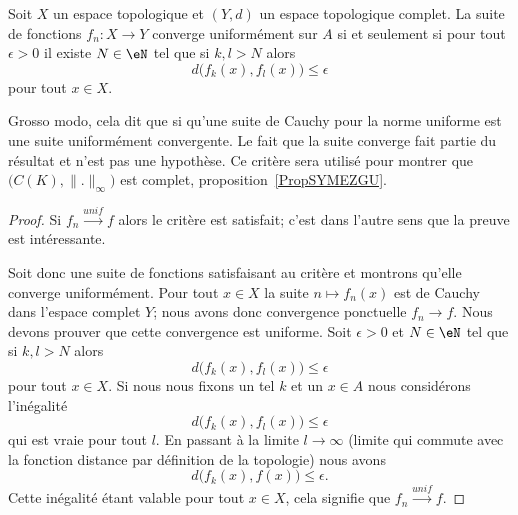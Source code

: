\begin{proposition}   \label{PropNTEynwq}
    Soit \( X\) un espace topologique et \( (Y,d)\) un espace topologique complet. La suite de fonctions \( f_n\colon X\to Y\) converge uniformément sur \( A\) si et seulement si pour tout \( \epsilon>0\) il existe \( N\in \eN\) tel que si \( k,l>N\) alors
    \begin{equation}
        d\big( f_k(x),f_l(x) \big)\leq \epsilon
    \end{equation}
    pour tout \( x\in X\).
\end{proposition}
Grosso modo, cela dit que si qu'une suite de Cauchy pour la norme uniforme est une suite uniformément convergente. Le fait que la suite converge fait partie du résultat et n'est pas une hypothèse. Ce critère sera utilisé pour montrer que \( \big( C(K),\| . \|_{\infty} \big)\) est complet, proposition~\ref{PropSYMEZGU}.

\begin{proof}
    Si \( f_n\stackrel{unif}{\longrightarrow}f\) alors le critère est satisfait; c'est dans l'autre sens que la preuve est intéressante.

    Soit donc une suite de fonctions satisfaisant au critère et montrons qu'elle converge uniformément. Pour tout \( x\in X\) la suite \( n\mapsto f_n(x)\) est de Cauchy dans l'espace complet \( Y\); nous avons donc convergence ponctuelle \( f_n\to f\). Nous devons prouver que cette convergence est uniforme. Soit \( \epsilon>0\) et \( N\in \eN\) tel que si \( k,l>N\) alors
    \begin{equation}
        d\big( f_k(x),f_l(x) \big)\leq \epsilon
    \end{equation}
    pour tout \( x\in X\). Si nous nous fixons un tel \( k\) et un \( x\in A\) nous considérons l'inégalité
    \begin{equation}
        d\big( f_k(x),f_l(x) \big)\leq \epsilon
    \end{equation}
    qui est vraie pour tout \( l\). En passant à la limite \( l\to\infty\) (limite qui commute avec la fonction distance par définition de la topologie) nous avons
    \begin{equation}
        d\big( f_k(x),f(x) \big)\leq \epsilon.
    \end{equation}
    Cette inégalité étant valable pour tout \( x\in X\), cela signifie que \( f_n\stackrel{unif}{\longrightarrow}f\).
\end{proof}


